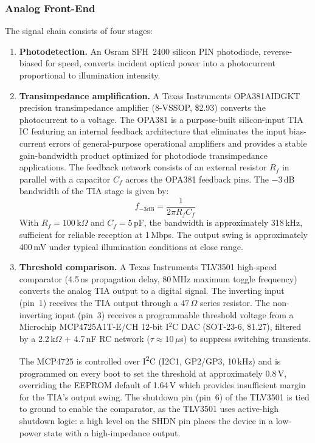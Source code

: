 \documentclass[conference]{IEEEtran}
\begin{document}
\subsubsection{Analog Front-End}

The signal chain consists of four stages:

\begin{enumerate}
\item \textbf{Photodetection.} An Osram SFH~2400 silicon PIN photodiode, reverse-biased for speed, converts incident optical power into a photocurrent proportional to illumination intensity.

\item \textbf{Transimpedance amplification.} A Texas Instruments OPA381AIDGKT precision transimpedance amplifier (8-VSSOP, \$2.93) converts the photocurrent to a voltage. The OPA381 is a purpose-built silicon-input TIA IC featuring an internal feedback architecture that eliminates the input bias-current errors of general-purpose operational amplifiers and provides a stable gain-bandwidth product optimized for photodiode transimpedance applications. The feedback network consists of an external resistor $R_f$ in parallel with a capacitor $C_f$ across the OPA381 feedback pins. The $-3$\,dB bandwidth of the TIA stage is given by:
\begin{equation}
f_{-3\text{dB}} = \frac{1}{2\pi R_f C_f}
\label{eq:tia_bw}
\end{equation}
With $R_f = 100$\,k$\Omega$ and $C_f = 5$\,pF, the bandwidth is approximately 318\,kHz, sufficient for reliable reception at 1\,Mbps. The output swing is approximately 400\,mV under typical illumination conditions at close range.

\item \textbf{Threshold comparison.} A Texas Instruments TLV3501 high-speed comparator (4.5\,ns propagation delay, 80\,MHz maximum toggle frequency) converts the analog TIA output to a digital signal. The inverting input (pin~1) receives the TIA output through a 47\,$\Omega$ series resistor. The non-inverting input (pin~3) receives a programmable threshold voltage from a Microchip MCP4725A1T-E/CH 12-bit I$^{2}$C DAC (SOT-23-6, \$1.27), filtered by a 2.2\,k$\Omega$ + 4.7\,nF RC network ($\tau \approx 10$\,$\mu$s) to suppress switching transients.

The MCP4725 is controlled over I\textsuperscript{2}C (I2C1, GP2/GP3, 10\,kHz) and is programmed on every boot to set the threshold at approximately 0.8\,V, overriding the EEPROM default of 1.64\,V which provides insufficient margin for the TIA's output swing. The shutdown pin (pin~6) of the TLV3501 is tied to ground to enable the comparator, as the TLV3501 uses active-high shutdown logic: a high level on the SHDN pin places the device in a low-power state with a high-impedance output.


\end{enumerate}
\end{document}
